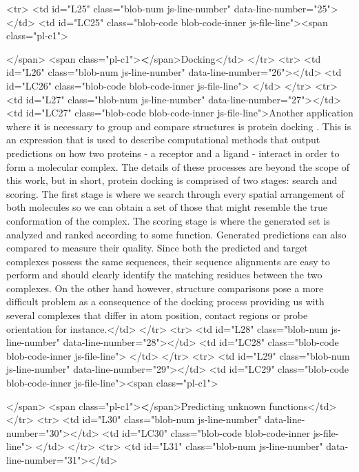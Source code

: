       <tr>
        <td id="L25" class="blob-num js-line-number" data-line-number="25"></td>
        <td id="LC25" class="blob-code blob-code-inner js-file-line"><span class="pl-c1">\item</span> <span class="pl-c1">\textbf</span>{Docking}</td>
      </tr>
      <tr>
        <td id="L26" class="blob-num js-line-number" data-line-number="26"></td>
        <td id="LC26" class="blob-code blob-code-inner js-file-line">
</td>
      </tr>
      <tr>
        <td id="L27" class="blob-num js-line-number" data-line-number="27"></td>
        <td id="LC27" class="blob-code blob-code-inner js-file-line">Another application where it is necessary to group and compare structures is protein docking \cite{halperin2002principles}. This is an expression that is used to describe computational methods that output predictions on how two proteins - a receptor and a ligand - interact in order to form a molecular complex. The details of these processes are beyond the scope of this work, but in short, protein docking is comprised of two stages: search and scoring. The first stage is where we search through every spatial arrangement of both molecules so we can obtain a set of those that might resemble the true conformation of the complex. The scoring stage is where the generated set is analyzed and ranked according to some function. Generated predictions can also compared to measure their quality. Since both the predicted and target complexes possess the same sequences, their sequence alignments are easy to perform and should clearly identify the matching residues between the two complexes. On the other hand however, structure comparisons pose a more difficult problem as a consequence of the docking process providing us with several complexes that differ in atom position, contact regions or probe orientation for instance.</td>
      </tr>
      <tr>
        <td id="L28" class="blob-num js-line-number" data-line-number="28"></td>
        <td id="LC28" class="blob-code blob-code-inner js-file-line">
</td>
      </tr>
      <tr>
        <td id="L29" class="blob-num js-line-number" data-line-number="29"></td>
        <td id="LC29" class="blob-code blob-code-inner js-file-line"><span class="pl-c1">\item</span> <span class="pl-c1">\textbf</span>{Predicting unknown functions}</td>
      </tr>
      <tr>
        <td id="L30" class="blob-num js-line-number" data-line-number="30"></td>
        <td id="LC30" class="blob-code blob-code-inner js-file-line">
</td>
      </tr>
      <tr>
        <td id="L31" class="blob-num js-line-number" data-line-number="31"></td>
